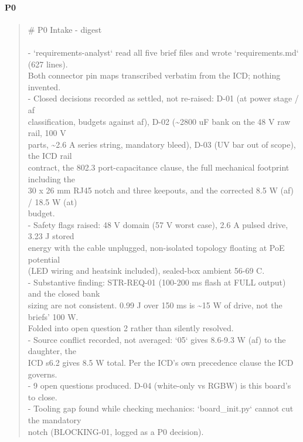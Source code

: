 \documentclass[11pt,a4paper]{article}
\begin{document}
\paragraph*{P0}
\begin{quote}\small\ttfamily\raggedright
\# P0 Intake - digest\\
~\\
- `requirements-analyst` read all five brief files and wrote `requirements.md` (627 lines).\\
  Both connector pin maps transcribed verbatim from the ICD; nothing invented.\\
- Closed decisions recorded as settled, not re-raised: D-01 (at power stage / af\\
  classification, budgets against af), D-02 (\textasciitilde{}2800 uF bank on the 48 V raw rail, 100 V\\
  parts, \textasciitilde{}2.6 A series string, mandatory bleed), D-03 (UV bar out of scope), the ICD rail\\
  contract, the 802.3 port-capacitance clause, the full mechanical footprint including the\\
  30 x 26 mm RJ45 notch and three keepouts, and the corrected 8.5 W (af) / 18.5 W (at)\\
  budget.\\
- Safety flags raised: 48 V domain (57 V worst case), 2.6 A pulsed drive, 3.23 J stored\\
  energy with the cable unplugged, non-isolated topology floating at PoE potential\\
  (LED wiring and heatsink included), sealed-box ambient 56-69 C.\\
- Substantive finding: STR-REQ-01 (100-200 ms flash at FULL output) and the closed bank\\
  sizing are not consistent. 0.99 J over 150 ms is \textasciitilde{}15 W of drive, not the briefs' 100 W.\\
  Folded into open question 2 rather than silently resolved.\\
- Source conflict recorded, not averaged: `05` gives 8.6-9.3 W (af) to the daughter, the\\
  ICD s6.2 gives 8.5 W total. Per the ICD's own precedence clause the ICD governs.\\
- 9 open questions produced. D-04 (white-only vs RGBW) is this board's to close.\\
- Tooling gap found while checking mechanics: `board\_init.py` cannot cut the mandatory\\
  notch (BLOCKING-01, logged as a P0 decision).
\end{quote}
\end{document}

